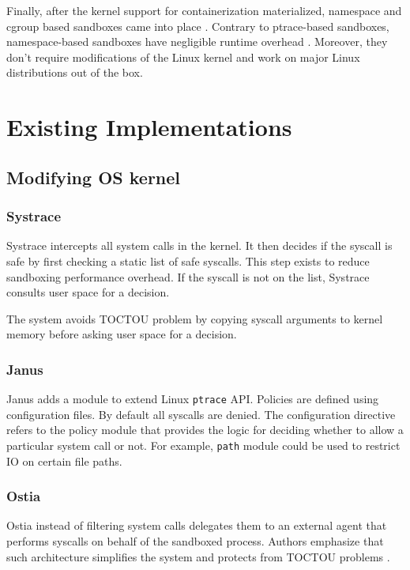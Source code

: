 \documentclass[en]{pracamgr}
\begin{document}
Finally, after the kernel support for containerization materialized, namespace and cgroup based sandboxes came into place \cite{marevs2012new, netblue30/firejail, raknes2016nsroot, google/nsjail, flatpak, SPACEK20151665}. Contrary to ptrace-based sandboxes, namespace-based sandboxes have negligible runtime overhead \cite{marevs2012new}. Moreover, they don't require modifications of the Linux kernel and work on major Linux distributions out of the box.

\section{Existing Implementations}

\subsection{Modifying OS kernel}

\subsubsection{Systrace}

Systrace \cite{provos2003improving} intercepts all system calls in the kernel. It then decides if the syscall is safe by first checking a static list of safe syscalls. This step exists to reduce sandboxing performance overhead. If the syscall is not on the list, Systrace consults user space for a decision.

The system avoids TOCTOU problem \cite{cwe_toctou} by copying syscall arguments to kernel memory before asking user space for a decision.

\subsubsection{Janus}
Janus \cite{garfinkel2004janus} adds a module to extend Linux \texttt{ptrace} API. Policies are defined using configuration files. By default all syscalls are denied. The configuration directive refers to the policy module that provides the logic for deciding whether to allow a particular system call or not. For example, \texttt{path} module could be used to restrict IO on certain file paths.

\subsubsection{Ostia}
Ostia \cite{garfinkel2004ostia} instead of filtering system calls delegates them to an external agent that performs syscalls on behalf of the sandboxed process. Authors emphasize that such architecture simplifies the system and protects from TOCTOU problems \cite{cwe_toctou}.
\end{document}
